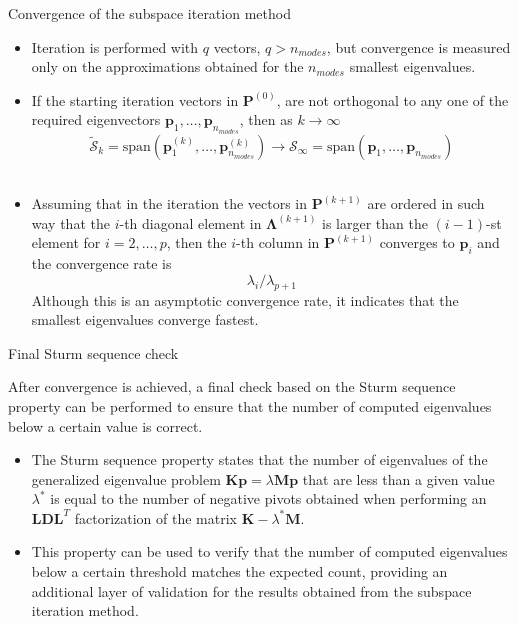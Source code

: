 \documentclass[aspectratio=169]{beamer}
\begin{document}
\begin{frame}{Convergence of the subspace iteration method}
  \begin{itemize}
    \item Iteration is performed with $q$ vectors, $q > n_{modes}$, but convergence is measured only on the approximations obtained for the $n_{modes}$ smallest eigenvalues.
    \item If the starting iteration vectors in $\mathbf P^{(0)}$, are not orthogonal to any one of the required eigenvectors $\mathbf p_1,\dots, \mathbf p_{n_{modes}}$, then as $k\to \infty$
          $$\tilde{\mathcal S}_k=\text{span}(\mathbf p^{(k)}_1, \dots, \mathbf p^{(k)}_{n_{modes}})\to \mathcal S_\infty = \text{span}(\mathbf p_1, \dots, \mathbf p_{n_{modes}})$$\
    \item  Assuming that in the iteration
          the vectors in $\mathbf P^{(k+1)}$ are ordered in such way that the $i$-th diagonal element in $\mathbf \Lambda^{(k+1)}$ is larger
          than the $(i - 1)$-st element for $i = 2,\dots, p$, then the $i$-th column in $\mathbf P^{(k+1)}$ converges to $\mathbf p_i$ and the convergence rate is
          $$\lambda_i/\lambda_{p+1}$$
          Although this is an asymptotic convergence rate, it indicates that the smallest eigenvalues converge fastest.
  \end{itemize}
\end{frame}

\begin{frame}{Final Sturm sequence check}
  \begin{block}{}
    After convergence is achieved, a final check based on the Sturm sequence property can be performed to ensure that the number of computed eigenvalues below a certain value is correct.
  \end{block}

  \begin{itemize}
    \item The Sturm sequence property states that the number of eigenvalues of the generalized eigenvalue problem \( \mathbf K\mathbf p = \lambda\mathbf M \mathbf p \) that are less than a given value \( \lambda^* \) is equal to the number of negative pivots obtained when performing an \( \mathbf L\mathbf  D\mathbf  L^T \) factorization of the matrix \( \mathbf K - \lambda^* \mathbf M \).
    \item This property can be used to verify that the number of computed eigenvalues below a certain threshold matches the expected count, providing an additional layer of validation for the results obtained from the subspace iteration method.
  \end{itemize}
\end{frame}
\end{document}
